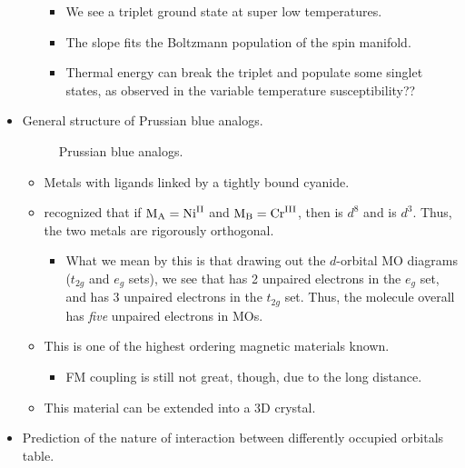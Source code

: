 \documentclass[../notes.tex]{subfiles}
\begin{document}
\begin{itemize}
\begin{itemize}
\begin{itemize}
            \item We see a triplet ground state at super low temperatures.
            \item The slope fits the Boltzmann population of the spin manifold.
            \item Thermal energy can break the triplet and populate some singlet states, as observed in the variable temperature susceptibility??
        \end{itemize}
    \end{itemize}
    \item General structure of Prussian blue analogs.
    \begin{figure}[h!]
        \centering
        \footnotesize
        \caption{Prussian blue analogs.}
        \label{fig:PrussianBlue}
    \end{figure}
    \begin{itemize}
        \item Metals with ligands linked by a tightly bound cyanide.
        \item \textcite{bib:PrussianBlue} recognized that if $\ce{M_A}=\ce{Ni^{II}}$ and $\ce{M_B}=\ce{Cr^{III}}$, then  is $d^8$ and  is $d^3$. Thus, the two metals are rigorously orthogonal.
        \begin{itemize}
            \item What we mean by this is that drawing out the $d$-orbital MO diagrams ($t_{2g}$ and $e_g$ sets), we see that  has 2 unpaired electrons in the $e_g$ set, and  has 3 unpaired electrons in the $t_{2g}$ set. Thus, the molecule overall has \emph{five} unpaired electrons in MOs.
        \end{itemize}
        \item This is one of the highest ordering magnetic materials known.
        \begin{itemize}
            \item FM coupling is still not great, though, due to the long distance.
        \end{itemize}
        \item This material can be extended into a 3D crystal.
    \end{itemize}
    \item Prediction of the nature of interaction between differently occupied orbitals table.
    \begin{table}[H]
        \centering

\end{table}
\end{itemize}
\end{document}
